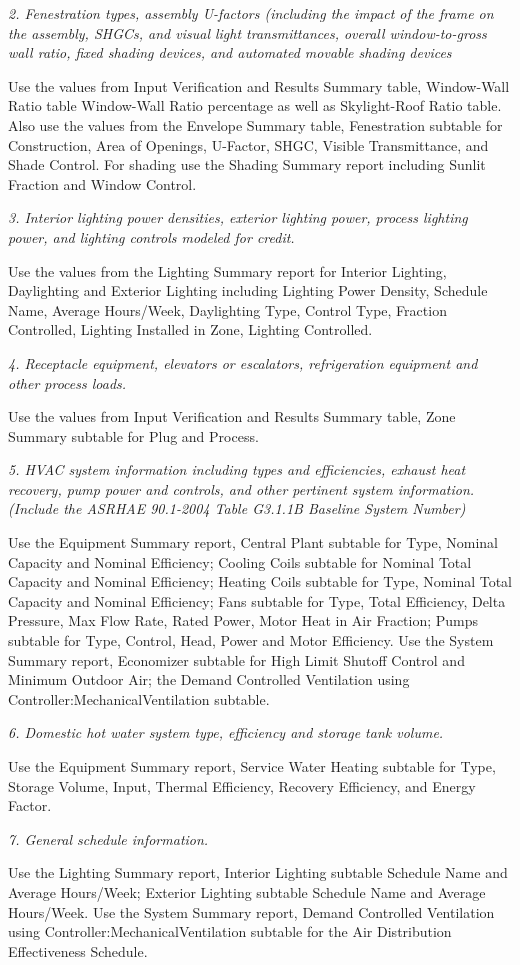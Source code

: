 \emph{2. Fenestration types, assembly U-factors (including the impact of the frame on the assembly, SHGCs, and visual light transmittances, overall window-to-gross wall ratio, fixed shading devices, and automated movable shading devices}

Use the values from Input Verification and Results Summary table, Window-Wall Ratio table Window-Wall Ratio percentage as well as Skylight-Roof Ratio table. Also use the values from the Envelope Summary table, Fenestration subtable for Construction, Area of Openings, U-Factor, SHGC, Visible Transmittance, and Shade Control. For shading use the Shading Summary report including Sunlit Fraction and Window Control.

\emph{3. Interior lighting power densities, exterior lighting power, process lighting power, and lighting controls modeled for credit.}

Use the values from the Lighting Summary report for Interior Lighting, Daylighting and Exterior Lighting including Lighting Power Density, Schedule Name, Average Hours/Week, Daylighting Type, Control Type, Fraction Controlled, Lighting Installed in Zone, Lighting Controlled.

\emph{4. Receptacle equipment, elevators or escalators, refrigeration equipment and other process loads.}

Use the values from Input Verification and Results Summary table, Zone Summary subtable for Plug and Process.

\emph{5. HVAC system information including types and efficiencies, exhaust heat recovery, pump power and controls, and other pertinent system information. (Include the ASRHAE 90.1-2004 Table G3.1.1B Baseline System Number)}

Use the Equipment Summary report, Central Plant subtable for Type, Nominal Capacity and Nominal Efficiency; Cooling Coils subtable for Nominal Total Capacity and Nominal Efficiency; Heating Coils subtable for Type, Nominal Total Capacity and Nominal Efficiency; Fans subtable for Type, Total Efficiency, Delta Pressure, Max Flow Rate, Rated Power, Motor Heat in Air Fraction; Pumps subtable for Type, Control, Head, Power and Motor Efficiency. Use the System Summary report, Economizer subtable for High Limit Shutoff Control and Minimum Outdoor Air; the Demand Controlled Ventilation using Controller:MechanicalVentilation subtable.

\emph{6. Domestic hot water system type, efficiency and storage tank volume.}

Use the Equipment Summary report, Service Water Heating subtable for Type, Storage Volume, Input, Thermal Efficiency, Recovery Efficiency, and Energy Factor.

\emph{7. General schedule information.}

Use the Lighting Summary report, Interior Lighting subtable Schedule Name and Average Hours/Week; Exterior Lighting subtable Schedule Name and Average Hours/Week. Use the System Summary report, Demand Controlled Ventilation using Controller:MechanicalVentilation subtable for the Air Distribution Effectiveness Schedule.
